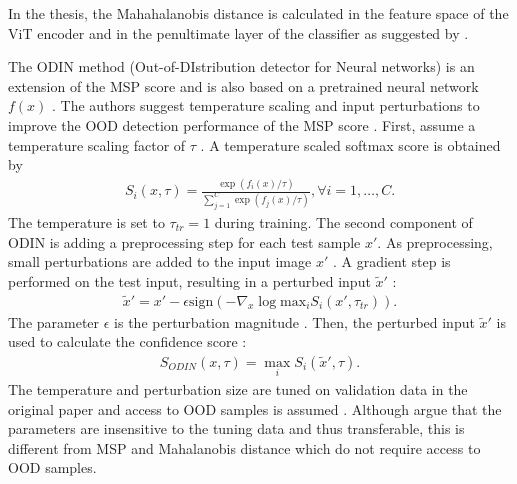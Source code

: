 In the thesis, the Mahahalanobis distance is calculated in the feature space of the ViT encoder and in the penultimate layer of the classifier as suggested by \citep{Lee2018, Michels2023}.
\par
The ODIN method (Out-of-DIstribution detector for Neural networks) is an extension of the MSP score and is also based on a pretrained neural network $f(x)$ \citep{Liang2018}.
The authors suggest temperature scaling and input perturbations to improve the OOD detection performance of the MSP score \citep{Liang2018}.
First, assume a temperature scaling factor of $\tau$ \citep{Liang2018}.
A temperature scaled softmax score is obtained by \citep{Liang2018}
\begin{align}
	S_i(x,\tau) = \frac{\exp(f_i(x)/\tau)}{\sum_{j=1}^{C}\exp(f_j(x)/\tau)}, \forall i=1,\dots,C.
\end{align}
The temperature is set to $\tau_{tr}=1$ \citep{Liang2018} during training.
The second component of ODIN is adding a preprocessing step for each test sample $x'$.
As preprocessing, small perturbations are added to the input image $x'$ \citep{Liang2018}.
A gradient step is performed on the test input, resulting in a perturbed input $\tilde{x}'$ \citep{Liang2018}: 
\begin{align}
	\tilde{x}' = x' - \epsilon \text{sign}(-\nabla_x \log \text{max}_i  S_i(x',\tau_{tr})).
\end{align}
The parameter $\epsilon$ is the perturbation magnitude \citep{Liang2018}.
Then, the perturbed input $\tilde{x}'$ is used to calculate the confidence score \citep{Liang2018}:
\begin{align}
	S_{ODIN}(x,\tau) = \max_i S_i(\tilde{x}',\tau).
\end{align}
The temperature and perturbation size are tuned on validation data in the original paper and access to OOD samples is assumed \citep{Liang2018,Hsu2020}. 
Although \citep{Liang2018} argue that the parameters are insensitive to the tuning data and thus transferable, this is different from MSP and Mahalanobis distance which do not require access to OOD samples.
